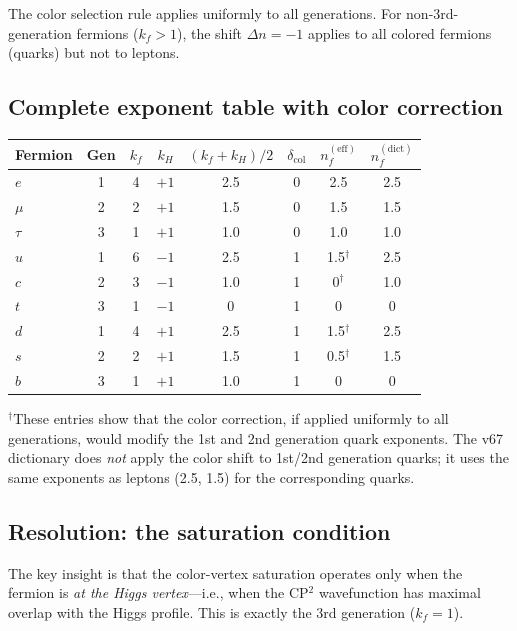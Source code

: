 \documentclass[11pt,a4paper]{article}
\theoremstyle{definition}
\theoremstyle{remark}
\begin{document}
The color selection rule applies uniformly to all generations.  For
non-3rd-generation fermions ($k_f > 1$), the shift $\Delta n = -1$
applies to all colored fermions (quarks) but not to leptons.

\subsection{Complete exponent table with color correction}

\begin{center}
\renewcommand{\arraystretch}{1.2}
\begin{tabular}{lccccccc}
\toprule
Fermion & Gen & $k_f$ & $k_H$ & $(k_f{+}k_H)/2$ &
$\delta_{\text{col}}$ & $n_f^{(\text{eff})}$ &
$n_f^{(\text{dict})}$ \\
\midrule
$e$ & 1 & 4 & $+1$ & 2.5 & 0 & 2.5 & 2.5 \\
$\mu$ & 2 & 2 & $+1$ & 1.5 & 0 & 1.5 & 1.5 \\
$\tau$ & 3 & 1 & $+1$ & 1.0 & 0 & 1.0 & 1.0 \\
\midrule
$u$ & 1 & 6 & $-1$ & 2.5 & 1 & 1.5$^\dagger$ & 2.5 \\
$c$ & 2 & 3 & $-1$ & 1.0 & 1 & 0$^\dagger$ & 1.0 \\
$t$ & 3 & 1 & $-1$ & 0 & 1 & 0 & 0 \\
\midrule
$d$ & 1 & 4 & $+1$ & 2.5 & 1 & 1.5$^\dagger$ & 2.5 \\
$s$ & 2 & 2 & $+1$ & 1.5 & 1 & 0.5$^\dagger$ & 1.5 \\
$b$ & 3 & 1 & $+1$ & 1.0 & 1 & 0 & 0 \\
\bottomrule
\end{tabular}
\end{center}

${}^\dagger$These entries show that the color correction, if applied
uniformly to all generations, would modify the 1st and 2nd generation
quark exponents.  The v67 dictionary does \emph{not} apply the color
shift to 1st/2nd generation quarks; it uses the same exponents as
leptons (2.5, 1.5) for the corresponding quarks.

\subsection{Resolution: the saturation condition}

The key insight is that the color-vertex saturation operates only when
the fermion is \emph{at the Higgs vertex}---i.e., when the CP$^2$
wavefunction has maximal overlap with the Higgs profile.  This is
exactly the 3rd generation ($k_f = 1$).
\end{document}
